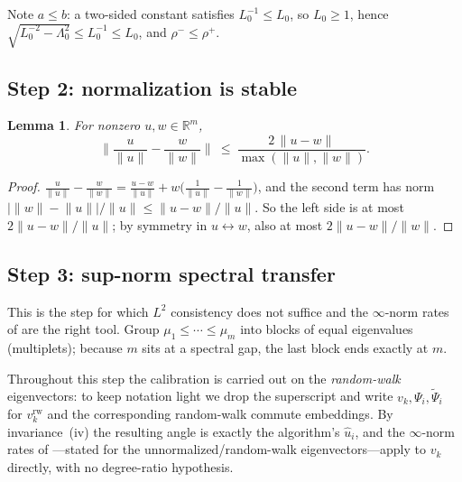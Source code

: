 \documentclass[11pt]{article}
\newtheorem{lemma}[theorem]{Lemma}
\theoremstyle{remark}
\begin{document}
Note $a\le b$: a two-sided constant satisfies $L_0^{-1}\le L_0$, so $L_0\ge1$,
hence $\sqrt{L_0^{-2}-\Lambda_0^2}\le L_0^{-1}\le L_0$, and $\rho^-\le\rho^+$.

\subsection*{Step 2: normalization is stable}
\begin{lemma}\label{lem:normstab}
For nonzero $u,w\in\mathbb{R}^m$,
\[
\Big\lVert \frac{u}{\lVert u\rVert}-\frac{w}{\lVert w\rVert}\Big\rVert
\ \le\ \frac{2\,\lVert u-w\rVert}{\max(\lVert u\rVert,\lVert w\rVert)}.
\]
\end{lemma}
\begin{proof}
$\frac{u}{\lVert u\rVert}-\frac{w}{\lVert w\rVert}
=\frac{u-w}{\lVert u\rVert}
+w\Big(\frac{1}{\lVert u\rVert}-\frac{1}{\lVert w\rVert}\Big)$, and the second
term has norm $\big|\lVert w\rVert-\lVert u\rVert\big|/\lVert u\rVert
\le\lVert u-w\rVert/\lVert u\rVert$. So the left side is at most
$2\lVert u-w\rVert/\lVert u\rVert$; by symmetry in $u\leftrightarrow w$, also at
most $2\lVert u-w\rVert/\lVert w\rVert$.
\end{proof}

\subsection*{Step 3: sup-norm spectral transfer}
This is the step for which $L^2$ consistency \cite{garciatrillos2018} does not
suffice and the $\infty$-norm rates of \cite{calder2022} are the right tool.
Group $\mu_1\le\cdots\le\mu_m$ into blocks of equal eigenvalues (multiplets);
because $m$ sits at a spectral gap, the last block ends exactly at $m$.

\smallskip\noindent Throughout this step the calibration is carried out on the
\emph{random-walk} eigenvectors: to keep notation light we drop the superscript
and write $v_k,\Psi_i,\widetilde\Psi_i$ for $v^{\mathrm{rw}}_k$ and the
corresponding random-walk commute embeddings. By invariance~(iv) the resulting
angle is exactly the algorithm's $\hat u_i$, and the $\infty$-norm rates of
\cite{calder2022}---stated for the unnormalized/random-walk eigenvectors---apply
to $v_k$ directly, with no degree-ratio hypothesis.
\end{document}
